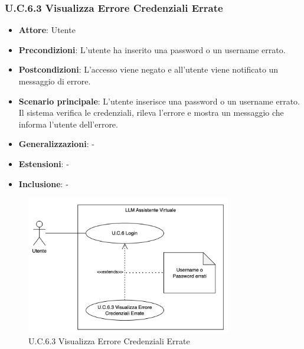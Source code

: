 \subsubsection{U.C.6.3 Visualizza Errore Credenziali Errate}
\begin{itemize}
    \item \textbf{Attore}: Utente
    \item \textbf{Precondizioni}: L'utente ha inserito una password o un username errato.
    \item \textbf{Postcondizioni}: L'accesso viene negato e all'utente viene notificato un messaggio di errore.
    \item \textbf{Scenario principale}: L'utente inserisce una password o un username errato. Il sistema verifica le credenziali, rileva l'errore e mostra un messaggio che informa l'utente dell'errore.
    \item \textbf{Generalizzazioni}: -
    \item \textbf{Estensioni}: -
    \item \textbf{Inclusione}: -
\end{itemize}
\begin{figure}[H]
    \centering
    \includegraphics[width=0.8\textwidth]{img/NUOVO6.3.png}
    \caption{U.C.6.3 Visualizza Errore Credenziali Errate}
\end{figure}

\newpage

